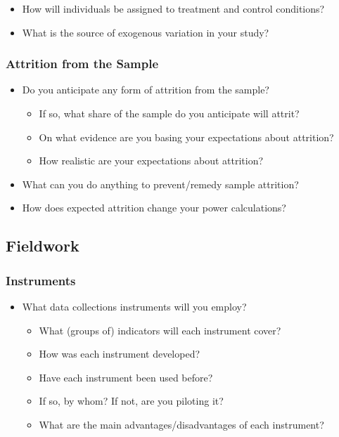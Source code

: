 \documentclass[12pt]{article}
\begin{document}
\begin{itemize}
\item How will individuals be assigned to treatment and control conditions?
\item What is the source of exogenous variation in your study?
\end{itemize}

\subsubsection{Attrition from the Sample}

\begin{itemize}
\item Do you anticipate any form of attrition from the sample?
\begin{itemize}
\item If so, what share of the sample do you anticipate will attrit? 
\item On what evidence are you basing your expectations about attrition?
\item How realistic are your expectations about attrition?
\end{itemize}
\item What can you do anything to prevent/remedy sample attrition?
\item How does expected attrition change your power calculations?
\end{itemize}

\subsection{Fieldwork}

\subsubsection{Instruments}

\begin{itemize}
\item What data collections instruments will you employ?
\begin{itemize}
\item What (groups of) indicators will each instrument cover?
\item How was each instrument developed?
\item Have each instrument been used before? 
\item If so, by whom? If not, are you piloting it?
\item What are the main advantages/disadvantages of each instrument? 
\end{itemize}
\end{itemize}
\end{document}

